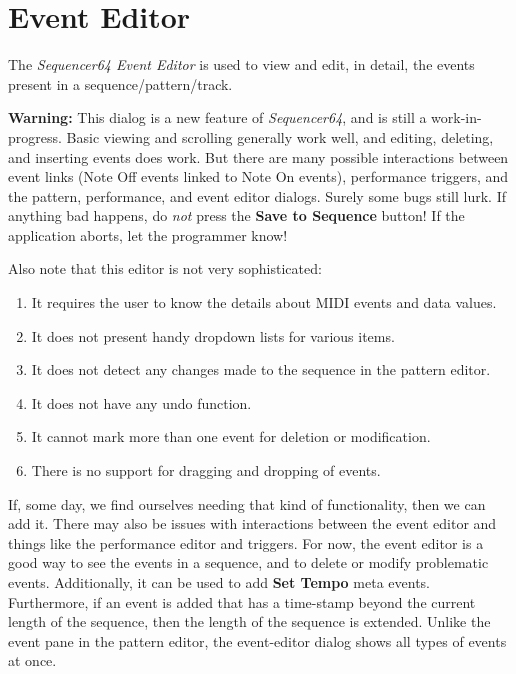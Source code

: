 %
%

\section{Event Editor}
\label{sec:seq64_event_editor}

   The \textsl{Sequencer64 Event Editor} is used to view and edit,
   in detail, the events present in a sequence/pattern/track.

   \textbf{Warning:}
   This dialog is a new feature of \textsl{Sequencer64}, and is
   still a work-in-progress.  Basic viewing and scrolling generally work well,
   and editing, deleting, and inserting events does work.
   But there are many possible interactions between event links (Note Off
   events linked to Note On events), performance triggers, and the pattern,
   performance, and event editor dialogs.
   Surely some bugs still lurk.
   If anything bad happens, do \textsl{not} press the
   \textbf{Save to Sequence} button!
   If the application aborts, let the programmer know!

   Also note that this editor is not very sophisticated:

   \begin{enumerate}
      \item It requires the user to know the details
         about MIDI events and data values.
      \item It does not present handy dropdown lists for various items.
      \item It does not detect any changes made to the sequence in the
         pattern editor.
      \item It does not have any undo function.
      \item It cannot mark more than one event for deletion or modification.
      \item There is no support for dragging and dropping of events.
   \end{enumerate}

   If, some day, we find ourselves needing
   that kind of functionality, then we can add it.
   There may also be issues with interactions between the event editor and
   things like the performance editor and triggers.
   For now, the event editor is a good way to see the events in a sequence,
   and to delete or modify problematic events.
   Additionally, it can be used to add \textbf{Set Tempo} meta events.
   Furthermore, if an event is added that has a time-stamp beyond the current
   length of the sequence, then the length of the sequence is extended.
   Unlike the event pane in the pattern editor, the event-editor
   dialog shows all types of events at once.

